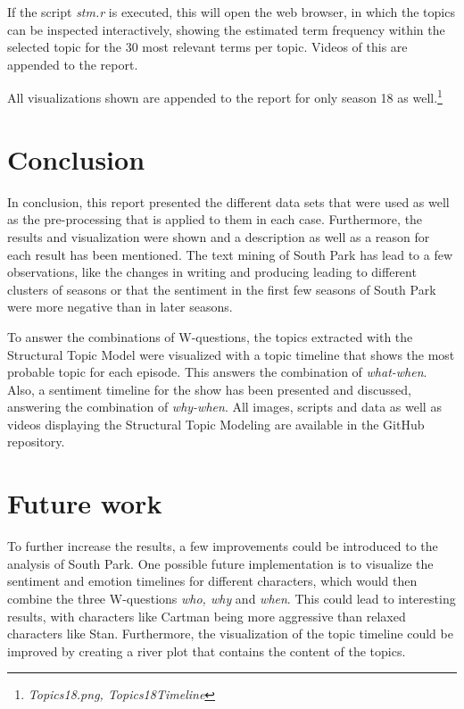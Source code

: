 \documentclass[10pt,a4paper]{article}
\begin{document}
	If the script \textit{stm.r} is executed, this will open the web browser, in which the topics can be inspected interactively, showing the estimated term frequency within the selected topic for the 30 most relevant terms per topic. Videos of this are appended to the report.
	
	All visualizations shown are appended to the report for only season 18 as well.\footnote{\textit{Topics18.png, Topics18Timeline}}
	
	\section{Conclusion}
	In conclusion, this report presented the different data sets that were used as well as the pre-processing that is applied to them in each case. Furthermore, the results and visualization were shown and a description as well as a reason for each result has been mentioned. The text mining of South Park has lead to a few observations, like the changes in writing and producing leading to different clusters of seasons or that the sentiment in the first few seasons of South Park were more negative than in later seasons.
	
	 To answer the combinations of W-questions, the topics extracted with the Structural Topic Model were visualized with a topic timeline that shows the most probable topic for each episode. This answers the combination of \textit{what-when}. 
	Also, a sentiment timeline for the show has been presented and discussed, answering the combination of \textit{why-when}.
	All images, scripts and data as well as videos displaying the Structural Topic Modeling are available in the GitHub repository.

	\section{Future work}
	To further increase the results, a few improvements could be introduced to the analysis of South Park.
	One possible future implementation is to visualize the sentiment and emotion timelines for different characters, which would then combine the three W-questions \textit{who, why}  and \textit{when}. This could lead to interesting results, with characters like Cartman being more aggressive than relaxed characters like Stan.
	Furthermore, the visualization of the topic timeline could be improved by creating a river plot that contains the content of the topics.
\end{document}
